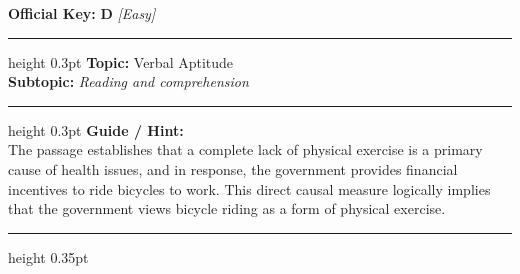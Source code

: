 \documentclass[a4paper,10pt]{article}
\begin{document}
\begin{tcolorbox}
\textbf{Official Key:} \textbf{\large D} \hfill \textit{\small [Easy]}
\vspace{2pt}\hrule height 0.3pt\vspace{3pt}
\textbf{Topic:} Verbal Aptitude \\
\textbf{Subtopic:} \textit{Reading and comprehension}
\vspace{2pt}\hrule height 0.3pt\vspace{3pt}
\textbf{Guide / Hint:} \\
{\small The passage establishes that a complete lack of physical exercise is a primary cause of health issues, and in response, the government provides financial incentives to ride bicycles to work. This direct causal measure logically implies that the government views bicycle riding as a form of physical exercise.}

\end{tcolorbox}
\vspace{6pt}\hrule height 0.35pt\vspace{6pt}
\noindent
\end{document}
